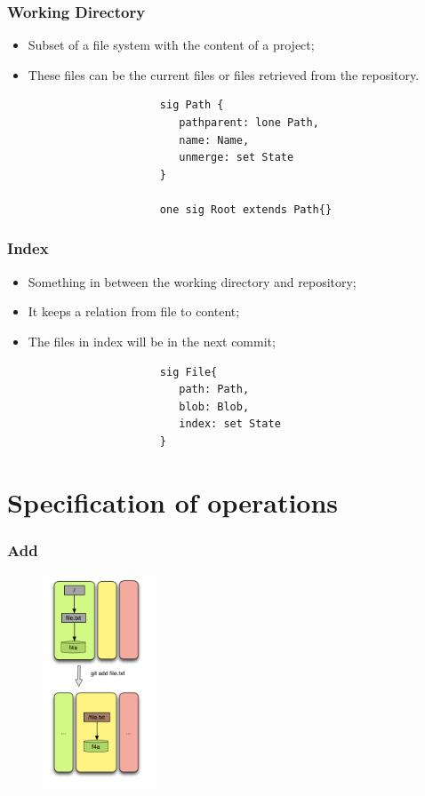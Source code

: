 \documentclass{beamer}
\begin{document}
\begin{frame}[fragile]
   \frametitle{Working Directory}
   \begin{itemize}
      \item Subset of a file system with the content of a project;
      \item These files can be the current files or files retrieved
      from the repository.
   \end{itemize}
   \tiny
   \color{blue}
   \begin{lstlisting}
                        sig Path {
                           pathparent: lone Path,
                           name: Name,
                           unmerge: set State
                        }

                        one sig Root extends Path{}
   \end{lstlisting}
\end{frame}

\begin{frame}[fragile]
   \frametitle{Index}
   \begin{itemize}
      \item Something in between the working directory and repository;
      \item It keeps a relation from file to content;
      \item The files in index will be in the next commit;
   \end{itemize}
   \vspace{10mm}
   \tiny
   \color{blue}
   \begin{lstlisting}
                        sig File{
                           path: Path,
                           blob: Blob,
                           index: set State
                        }

   \end{lstlisting}

\end{frame}


\section{Specification of operations}

\begin{frame}[fragile]
   \frametitle{Add}
   \begin{figure}
      \centering
      \includegraphics[width=0.3\textwidth]{images/add1.png}
   \end{figure}
\end{frame}
\end{document}
